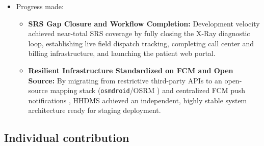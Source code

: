 \documentclass[onecolumn,journal]{IEEEtran}
\begin{document}
\begin{itemize}
\begin{itemize}
			\item \textbf{High-Frequency Telemetry vs. Battery and Caching Balance:} Maintaining continuous 30-second location capture for traveling field staff without causing rapid battery drain or data loss in low-connectivity zones presented technical bottlenecks. This was addressed by optimizing Android WorkManager foreground services to capture coordinates efficiently, backing location payloads with an SQLite offline cache that auto-flushes to the backend upon network restoration.
			
			\item \textbf{API Access Hardening Without Service Disruption:} Enforcing zero-trust authentication across sensitive patient PII and specialist endpoints risked breaking active client web and mobile workflows. The team systematically audited all routes, applying custom NestJS guards and role-based access parameters to isolate data access cleanly without disrupting user sessions.
		\end{itemize}
		
		\item Progress made:
		\begin{itemize}
			\item \textbf{SRS Gap Closure and Workflow Completion:} Development velocity achieved near-total SRS coverage by fully closing the X-Ray diagnostic loop, establishing live field dispatch tracking, completing call center and billing infrastructure, and launching the patient web portal.
			
			\item \textbf{Resilient Infrastructure Standardized on FCM and Open Source:} By migrating from restrictive third-party APIs to an open-source mapping stack (\texttt{osmdroid}/OSRM \cite{osmdroid2024}) and centralized FCM push notifications \cite{firebase2024fcm}, HHDMS achieved an independent, highly stable system architecture ready for staging deployment.
		\end{itemize}
	\end{itemize}
	
	\subsection{Individual contribution}
	
\end{document}
